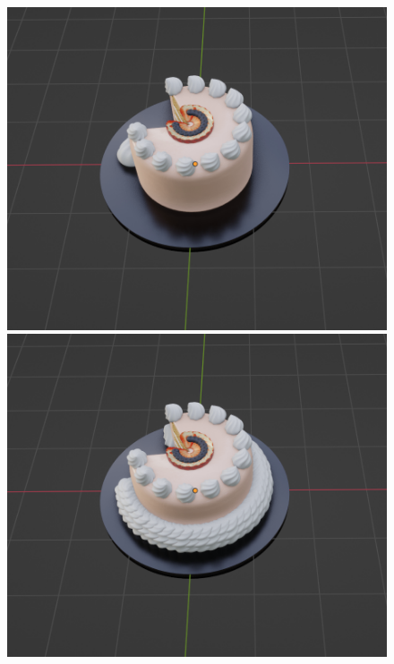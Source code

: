 \begin{figure}[h]
 \begin{minipage}[b]{0.48\linewidth}
  \centering
  \includegraphics[scale=0.25]{./imgs/cakeParamMean/botQuanMin.png}
 \end{minipage}
 \begin{minipage}[b]{0.48\linewidth}
  \centering
  \includegraphics[scale=0.25]{./imgs/cakeParamMean/botQuanMax.png}

\end{minipage}
\end{figure}
